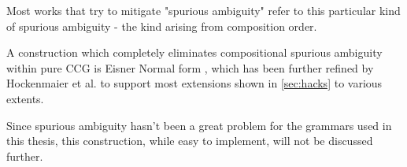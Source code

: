 \documentclass[main.tex]{subfiles}
\begin{document}
Most works that try to mitigate "spurious ambiguity" refer to this particular
kind of spurious ambiguity - the kind arising from composition order.

A construction which completely eliminates compositional spurious ambiguity
within pure CCG is Eisner Normal form \cite{eisner}, which has been further
refined by Hockenmaier et al. \cite{julia} to support most extensions shown
in \cref{sec:hacks} to various extents.

Since spurious ambiguity hasn't been a great problem for the grammars used
in this thesis, this construction, while easy to implement, will not be
discussed further.
\end{document}

